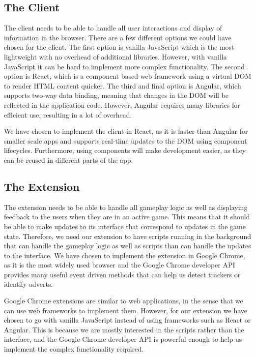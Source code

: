 \documentclass{l4proj}
\begin{document}
\subsection{The Client}
The client needs to be able to handle all user interactions and display of information in the browser. There are a few different options we could have chosen for the client. The first option is vanilla JavaScript which is the most lightweight
with no overhead of additional libraries. However, with vanilla JavaScript it can be hard to implement more complex functionality. The second option is React, which is a component based web framework using a virtual DOM to render HTML 
content quicker. The third and final option is Angular, which supports two-way data binding, meaning that changes in the DOM will be reflected in the application code. However, Angular requires many libraries for efficient use, resulting in a lot
of overhead.

We have chosen to implement the client in React, as it is faster than Angular for smaller scale apps and supports real-time updates to the DOM using component lifecycles. Furthermore, using components will make development easier, as they
can be reused in different parts of the app.

\subsection{The Extension}
The extension needs to be able to handle all gameplay logic as well as displaying feedback to the users when they are in an active game. This means that it should be able to make updates to its interface that correspond to updates in the game state.
Therefore, we need our extension to have scripts running in the background that can handle the gameplay logic as well as scripts than can handle the updates to the interface. We have chosen to implement the extension in Google Chrome, as it is the
most widely used browser and the Google Chrome developer API provides many useful event driven methods that can help us detect trackers or identify adverts.

Google Chrome extensions are similar to web applications, in the sense that we can use web frameworks to implement them. However, for our extension we have chosen to go with vanilla JavaScript instead of using frameworks such as React or Angular.
This is because we are mostly interested in the scripts rather than the interface, and the Google Chrome developer API is powerful enough to help us implement the complex functionality required.
\end{document}
